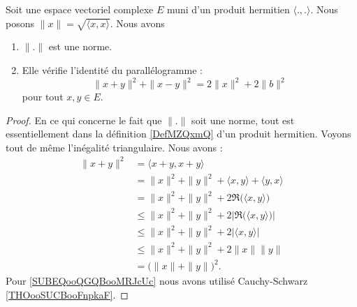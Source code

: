 \begin{proposition}        \label{PROPooSSYJooHAXAnC}
    Soit une espace vectoriel complexe \( E\) muni d'un produit hermitien \( \langle ., .\rangle \). Nous posons \( \| x \|=\sqrt{ \langle x, x\rangle  }\). Nous avons
    \begin{enumerate}
        \item
            \( \| . \|\) est une norme.
        \item
            Elle vérifie l'identité du parallélogramme :
            \begin{equation}
                \| x+y \|^2+\| x-y \|^2=2\| x \|^2+2\| b \|^2
            \end{equation}
            pour tout \( x,y\in E\).
    \end{enumerate}
\end{proposition}

\begin{proof}
    En ce qui concerne le fait que \( \| . \|\) soit une norme, tout est essentiellement dans la définition \ref{DefMZQxmQ} d'un produit hermitien. Voyons tout de même l'inégalité triangulaire. Nous avons :
    \begin{subequations}
        \begin{align}
            \| x+y \|^2 & =\langle x+y, x+y\rangle                                        \\
                        & =\| x \|^2+\| y \|^2+\langle x, y\rangle +\langle y, x\rangle   \\
                        & =\| x \|^2+\| y \|^2+2\Re\big( \langle x, y\rangle  \big)       \\
                        & \leq\| x \|^2+\| y \|^2+2|\Re\big( \langle x, y\rangle  \big)|  \\
                        & \leq\| x \|^2+\| y \|^2+2| \langle x, y\rangle  |               \\
                        & \leq \| x \|^2+\| y \|^2+2\| x \|\| y \|\label{SUBEQooQGQBooMRJcUc} \\
                        & =\big( \| x \|+\| y \| \big)^2.
        \end{align}
    \end{subequations}
    Pour \eqref{SUBEQooQGQBooMRJcUc} nous avons utilisé Cauchy-Schwarz \ref{THOooSUCBooFnpkaF}.
\end{proof}

